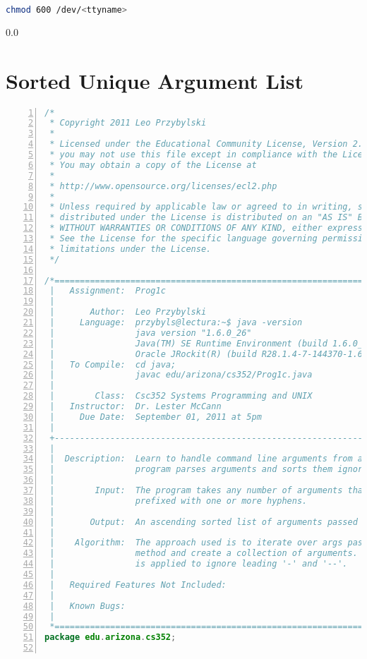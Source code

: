 \documentclass[11pt,notitlepage]{article}
\begin{document}
\begin{lstlisting}[language=bash,basicstyle=\scriptsize,backgroundcolor=\color{ubergray},caption={trnapp-config.xml},frame=single,breaklines=true]
  chmod 600 /dev/<ttyname>
\end{lstlisting}

\newpage
  {\setlength{\baselineskip}%
           {0.0\baselineskip}
  \section*{Sorted Unique Argument List}
  \hrulefill \par}
\begin{lstlisting}[numbers=left,language=java,basicstyle=\scriptsize,backgroundcolor=\color{ubergray},caption={trnapp-config.xml},frame=single,breaklines=true]
/*
 * Copyright 2011 Leo Przybylski
 * 
 * Licensed under the Educational Community License, Version 2.0 (the "License");
 * you may not use this file except in compliance with the License.
 * You may obtain a copy of the License at
 * 
 * http://www.opensource.org/licenses/ecl2.php
 * 
 * Unless required by applicable law or agreed to in writing, software
 * distributed under the License is distributed on an "AS IS" BASIS,
 * WITHOUT WARRANTIES OR CONDITIONS OF ANY KIND, either express or implied.
 * See the License for the specific language governing permissions and
 * limitations under the License.
 */

/*=============================================================================
 |   Assignment:  Prog1c
 |
 |       Author:  Leo Przybylski
 |     Language:  przybyls@lectura:~$ java -version
 |                java version "1.6.0_26"
 |                Java(TM) SE Runtime Environment (build 1.6.0_26-b03)
 |                Oracle JRockit(R) (build R28.1.4-7-144370-1.6.0_26-20110617-2130-linux-x86_64, compiled mode)
 |   To Compile:  cd java;
 |                javac edu/arizona/cs352/Prog1c.java
 |
 |        Class:  Csc352 Systems Programming and UNIX
 |   Instructor:  Dr. Lester McCann
 |     Due Date:  September 01, 2011 at 5pm
 |
 +-----------------------------------------------------------------------------
 |
 |  Description:  Learn to handle command line arguments from a Unix shell. The
 |                program parses arguments and sorts them ignoring leading hyphens
 |
 |        Input:  The program takes any number of arguments that may or may not be
 |                prefixed with one or more hyphens.
 |
 |       Output:  An ascending sorted list of arguments passed in is printed out.
 |
 |    Algorithm:  The approach used is to iterate over args passed into the main
 |                method and create a collection of arguments. A Comparator
 |                is applied to ignore leading '-' and '--'.
 |
 |   Required Features Not Included:  
 |
 |   Known Bugs: 
 |
 *===========================================================================*/
package edu.arizona.cs352;


\end{lstlisting}
\end{document}
